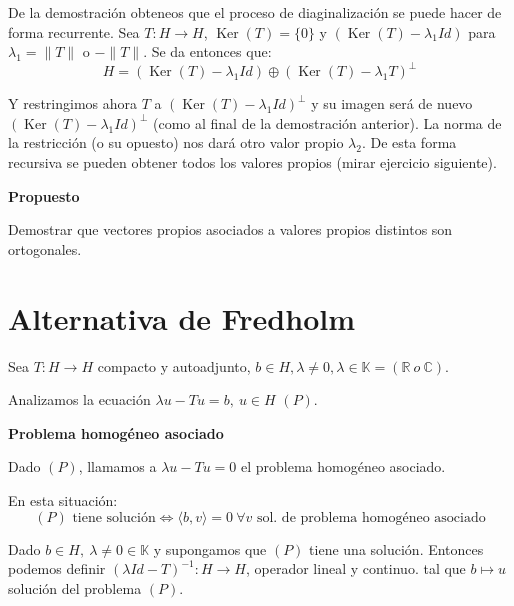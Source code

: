 \documentclass[openany]{book}
\begin{document}
De la demostración obteneos que el proceso de diaginalización se puede hacer de forma recurrente. Sea $ T: H \to H$, $ \operatorname{Ker}(T) = \{0\}  $ y $ (\operatorname{Ker}(T)- \lambda_1 Id)$ para $ \lambda_1    =  \|T\|$ o $ -\|T\|$. Se da entonces que:
$$ H = (\operatorname{Ker}(T)- \lambda_1 Id) \oplus (\operatorname{Ker}(T)-\lambda_1 T)^{\perp} $$

Y restringimos ahora $ T$ a $ (\operatorname{Ker}(T)-\lambda_1 Id )^{\perp}$ y su imagen será de nuevo $ (\operatorname{Ker}(T)-\lambda_1 Id )^{\perp}$ (como al final de la demostración anterior). La norma de la restricción (o su opuesto) nos dará otro valor propio $ \lambda_2 $. De esta forma recursiva se pueden obtener todos los valores propios (mirar ejercicio siguiente).

\begin{exercise}
    \textbf{Propuesto}

    Demostrar que vectores propios asociados a valores propios distintos son ortogonales.
\end{exercise}

\section{Alternativa de Fredholm}

    Sea $ T: H \to H$ compacto y autoadjunto, $ b \in H, \lambda  \ne 0, \lambda  \in \mathbb{K} = (\mathbb{R}\ o\ \mathbb{C})$.

    Analizamos la ecuación $ \lambda  u -Tu = b,\ u \in H$ $ (P)$.

\begin{definition}
    \textbf{Problema homogéneo asociado}

    Dado $ (P)$, llamamos a $ \lambda u-Tu = 0$ el problema homogéneo asociado.
\end{definition}


\begin{theorem}
    En esta situación:
    $$ (P) \text{ tiene solución} \iff \langle b, v \rangle = 0 \ \forall v \text{ sol. de problema homogéneo asociado}$$
\end{theorem}

\begin{lemma}
    Dado $ b \in H,\ \lambda \ne 0 \in \mathbb{K}$ y supongamos que $ (P)$ tiene una solución. Entonces podemos definir $ (\lambda Id-T) ^{-1}: H\to H$, operador lineal y continuo. tal que $ b \mapsto u$ solución del problema $ (P)$.
\end{lemma}
\end{document}
